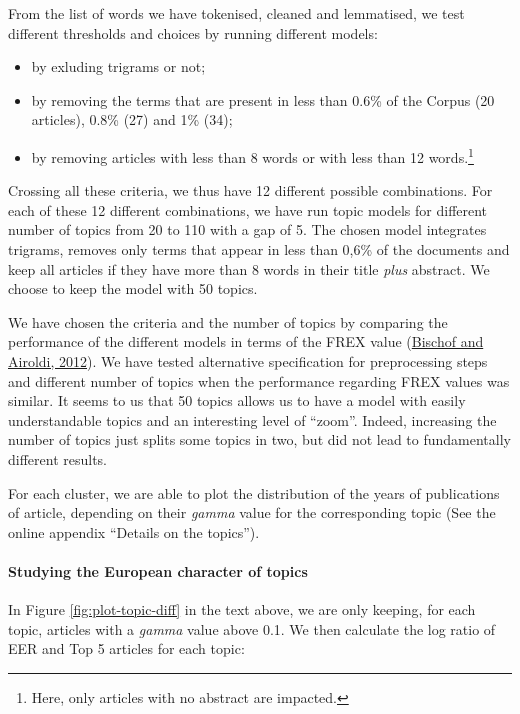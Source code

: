 \documentclass[
  12pt,
  onecolumn]{article}
\providecommand{\tightlist}{%
  \setlength{\itemsep}{0pt}\setlength{\parskip}{0pt}}
\begin{document}
From the list of words we have tokenised, cleaned and lemmatised, we test different thresholds and choices by running different models:

\begin{itemize}
\tightlist
\item
  by exluding trigrams or not;
\item
  by removing the terms that are present in less than 0.6\% of the Corpus (20 articles), 0.8\% (27) and 1\% (34);
\item
  by removing articles with less than 8 words or with less than 12 words.\footnote{Here, only articles with no abstract are impacted.}
\end{itemize}

Crossing all these criteria, we thus have 12 different possible combinations. For each of these 12 different combinations, we have run topic models for different number of topics from 20 to 110 with a gap of 5. The chosen model integrates trigrams, removes only terms that appear in less than 0,6\% of the documents and keep all articles if they have more than 8 words in their title \emph{plus} abstract. We choose to keep the model with 50 topics.

We have chosen the criteria and the number of topics by comparing the performance of the different models in terms of the FREX value (\protect\hyperlink{ref-bischof2012}{Bischof and Airoldi, 2012}). We have tested alternative specification for preprocessing steps and different number of topics when the performance regarding FREX values was similar. It seems to us that 50 topics allows us to have a model with easily understandable topics and an interesting level of ``zoom''. Indeed, increasing the number of topics just splits some topics in two, but did not lead to fundamentally different results.

For each cluster, we are able to plot the distribution of the years of publications of article, depending on their \emph{gamma} value for the corresponding topic (See the online appendix ``Details on the topics'').

\hypertarget{studying-the-european-character-of-topics}{%
\paragraph*{Studying the European character of topics}\label{studying-the-european-character-of-topics}}

In Figure \ref{fig:plot-topic-diff} in the text above, we are only keeping, for each topic, articles with a \emph{gamma} value above 0.1. We then calculate the log ratio of EER and Top 5 articles for each topic:
\end{document}
